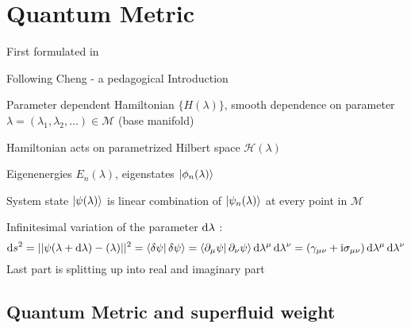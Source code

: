 \documentclass[../main.tex]{subfiles}
\begin{document}
\chapter{Quantum Metric}

First formulated in \cite{provostRiemannianStructureManifolds1980}
	
Following Cheng - a pedagogical Introduction 

Parameter dependent Hamiltonian \(\{H(\lambda)\}\), smooth dependence on parameter \(\lambda = (\lambda_1, \lambda_2, \ldots) \in \mathcal{M}\) (base manifold)

Hamiltonian acts on parametrized Hilbert space \(\mathcal{H} (\lambda)\)

Eigenenergies \(E_n (\lambda)\), eigenstates \(\ket{\phi_n (\lambda)}\)

System state \(\ket{\psi (\lambda)}\) is linear combination of \(\ket{\psi_n (\lambda)}\) at every point in \(\mathcal{M}\)

Infinitesimal variation of the parameter \(\odif{\lambda}\) :
\begin{equation}
	\odif{s^2} = \vert\vert \psi (\lambda + \odif{\lambda}) - \si (\lambda) \vert \vert^2 = \braket{\fdif{\psi} | \fdif{\psi}} = \braket{\pdif{\mu} \psi | \pdif{\nu} \psi} \odif{\lambda^{\mu}} \odif{\lambda^{\nu}} = (\gamma_{\mu \nu} + \iu \sigma_{\mu \nu}) \odif{\lambda^{\mu}} \odif{\lambda^{\nu}}
\end{equation}
Last part is splitting up into real and imaginary part

\section{Quantum Metric and superfluid weight}

\end{document}
